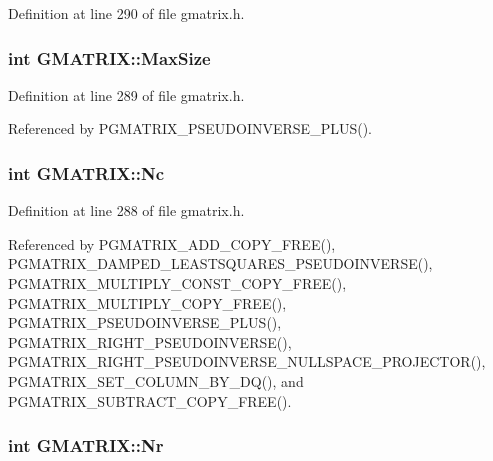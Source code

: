 Definition at line 290 of file gmatrix.\-h.

\hypertarget{structGMATRIX_a1533cd0d810051967bf2e9e301e870b0}{
\subsubsection[{Max\-Size}]{\setlength{\rightskip}{0pt plus 5cm}int G\-M\-A\-T\-R\-I\-X\-::\-Max\-Size}}\label{structGMATRIX_a1533cd0d810051967bf2e9e301e870b0}


Definition at line 289 of file gmatrix.\-h.



Referenced by P\-G\-M\-A\-T\-R\-I\-X\-\_\-\-P\-S\-E\-U\-D\-O\-I\-N\-V\-E\-R\-S\-E\-\_\-\-P\-L\-U\-S().

\hypertarget{structGMATRIX_ad90d07add5c0ed480c17f9d407a00f30}{
\subsubsection[{Nc}]{\setlength{\rightskip}{0pt plus 5cm}int G\-M\-A\-T\-R\-I\-X\-::\-Nc}}\label{structGMATRIX_ad90d07add5c0ed480c17f9d407a00f30}


Definition at line 288 of file gmatrix.\-h.



Referenced by P\-G\-M\-A\-T\-R\-I\-X\-\_\-\-A\-D\-D\-\_\-\-C\-O\-P\-Y\-\_\-\-F\-R\-E\-E(), P\-G\-M\-A\-T\-R\-I\-X\-\_\-\-D\-A\-M\-P\-E\-D\-\_\-\-L\-E\-A\-S\-T\-S\-Q\-U\-A\-R\-E\-S\-\_\-\-P\-S\-E\-U\-D\-O\-I\-N\-V\-E\-R\-S\-E(), P\-G\-M\-A\-T\-R\-I\-X\-\_\-\-M\-U\-L\-T\-I\-P\-L\-Y\-\_\-\-C\-O\-N\-S\-T\-\_\-\-C\-O\-P\-Y\-\_\-\-F\-R\-E\-E(), P\-G\-M\-A\-T\-R\-I\-X\-\_\-\-M\-U\-L\-T\-I\-P\-L\-Y\-\_\-\-C\-O\-P\-Y\-\_\-\-F\-R\-E\-E(), P\-G\-M\-A\-T\-R\-I\-X\-\_\-\-P\-S\-E\-U\-D\-O\-I\-N\-V\-E\-R\-S\-E\-\_\-\-P\-L\-U\-S(), P\-G\-M\-A\-T\-R\-I\-X\-\_\-\-R\-I\-G\-H\-T\-\_\-\-P\-S\-E\-U\-D\-O\-I\-N\-V\-E\-R\-S\-E(), P\-G\-M\-A\-T\-R\-I\-X\-\_\-\-R\-I\-G\-H\-T\-\_\-\-P\-S\-E\-U\-D\-O\-I\-N\-V\-E\-R\-S\-E\-\_\-\-N\-U\-L\-L\-S\-P\-A\-C\-E\-\_\-\-P\-R\-O\-J\-E\-C\-T\-O\-R(), P\-G\-M\-A\-T\-R\-I\-X\-\_\-\-S\-E\-T\-\_\-\-C\-O\-L\-U\-M\-N\-\_\-\-B\-Y\-\_\-\-D\-Q(), and P\-G\-M\-A\-T\-R\-I\-X\-\_\-\-S\-U\-B\-T\-R\-A\-C\-T\-\_\-\-C\-O\-P\-Y\-\_\-\-F\-R\-E\-E().

\hypertarget{structGMATRIX_ad0cd3f750b92dcd404d04ddc2ec5b5d6}{
\subsubsection[{Nr}]{\setlength{\rightskip}{0pt plus 5cm}int G\-M\-A\-T\-R\-I\-X\-::\-Nr}}\label{structGMATRIX_ad0cd3f750b92dcd404d04ddc2ec5b5d6}


